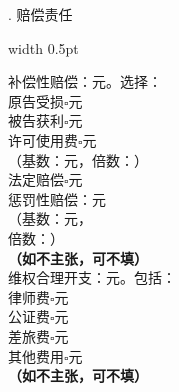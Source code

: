 \documentclass[a4paper,12pt,twoside]{ctexart}
\begin{document}
\begin{notesection}[top=4bp, bottom=4bp]
\begin{minipage}[c]{112.9bp}%
    \centering\songti\fontsize{10.5bp}{10.5bp}. 赔偿责任%
\end{minipage}%
\hspace{0pt}%
\vrule width 0.5pt%
\hspace{4bp}%
\begin{minipage}[t]{168bp}%
    \vspace{4bp}%
    \songti\mdseries\fontsize{10.5bp}{17bp}\selectfont%
    \baselineskip=17bp\setlength{\parindent}{0pt}\color{inkblack}%
    补偿性赔偿：\hspace{2em}元。选择：\\
    原告受损$\square$\hspace{2em}元\\
    被告获利$\square$\hspace{2em}元\\
    许可使用费$\square$\hspace{2em}元\\
    （基数：\hspace{2em}元，倍数：\hspace{2em}）\\
    法定赔偿$\square$\hspace{2em}元\\
    惩罚性赔偿：\hspace{2em}元\\
    （基数：\hspace{2em}元，\\
    倍数：\hspace{2em}）\\
    {\heiti\bfseries（如不主张，可不填）}\\
    维权合理开支：\hspace{2em}元。包括：\\
    律师费$\square$\hspace{2em}元\\
    公证费$\square$\hspace{2em}元\\
    差旅费$\square$\hspace{2em}元\\
    其他费用$\square$\hspace{2em}元\\
    {\heiti\bfseries（如不主张，可不填）}%
    \vspace{4bp}%
\end{minipage}%

\end{notesection}
\end{document}
